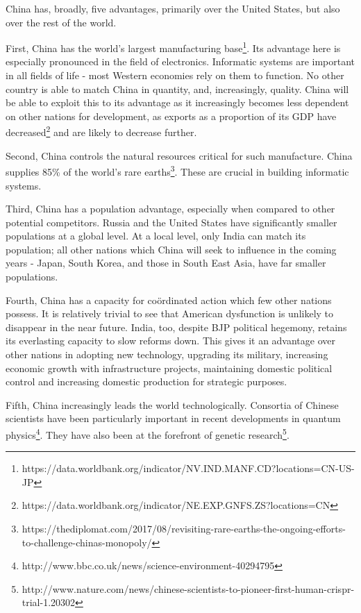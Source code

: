 \documentclass[11pt,a4paper]{report}
\newcounter{count}
\begin{document}
\begin{multicols}{2}
	
China has, broadly, five advantages, primarily over the United States,
but also over the rest of the world.

First, China has the world's largest manufacturing base\footnote{https://data.worldbank.org/indicator/NV.IND.MANF.CD?locations=CN-US-JP}.
Its advantage here is especially pronounced in the field of electronics.
Informatic systems are important in all fields of life - most Western
economies rely on them to function. No other country is able to match
China in quantity, and, increasingly, quality. China will be able to
exploit this to its advantage as it increasingly becomes less dependent
on other nations for development, as exports as a proportion of its GDP
have decreased\footnote{https://data.worldbank.org/indicator/NE.EXP.GNFS.ZS?locations=CN}
and are likely to decrease further.

Second, China controls the natural resources critical for such
manufacture. China supplies 85\% of the world's rare earths\footnote{https://thediplomat.com/2017/08/revisiting-rare-earths-the-ongoing-efforts-to-challenge-chinas-monopoly/}.
These are crucial in building informatic systems.

Third, China has a population advantage, especially when compared to
other potential competitors. Russia and the United States have
significantly smaller populations at a global level. At a local level,
only India can match its population; all other nations which China will
seek to influence in the coming years - Japan, South Korea, and those in
South East Asia, have far smaller populations.

Fourth, China has a capacity for coördinated action which few other
nations possess. It is relatively trivial to see that American
dysfunction is unlikely to disappear in the near future. India, too,
despite BJP political hegemony, retains its everlasting capacity to slow
reforms down. This gives it an advantage over other nations in adopting
new technology, upgrading its military, increasing economic growth with
infrastructure projects, maintaining domestic political control and
increasing domestic production for strategic purposes.

Fifth, China increasingly leads the world technologically. Consortia of
Chinese scientists have been particularly important in recent
developments in quantum physics\footnote{http://www.bbc.co.uk/news/science-environment-40294795}.
They have also been at the forefront of genetic research\footnote{http://www.nature.com/news/chinese-scientists-to-pioneer-first-human-crispr-trial-1.20302}.

\end{multicols}
\end{document}
